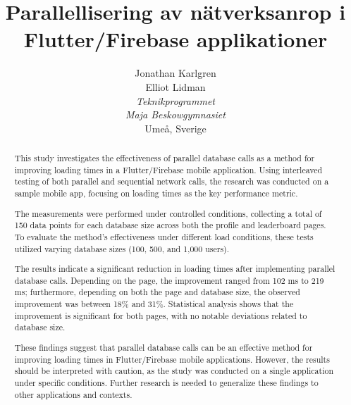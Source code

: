 \documentclass[letterpaper,twocolumn,10pt]{article}
\begin{document}
\RaggedRight

\date{}

\title{Parallellisering av nätverksanrop i Flutter/Firebase applikationer}

\author{{\rm Jonathan Karlgren} \\ {\rm Elliot Lidman} \\
\textit{Teknikprogrammet} \\
\textit{Maja Beskowgymnasiet}\\
{\rm Umeå, Sverige}}

\maketitle

\begin{abstract}
This study investigates the effectiveness of parallel database calls as a method for improving loading times in a Flutter/Firebase mobile application. Using interleaved testing of both parallel and sequential network calls, the research was conducted on a sample mobile app, focusing on loading times as the key performance metric.

The measurements were performed under controlled conditions, collecting a total of 150 data points for each database size across both the profile and leaderboard pages. To evaluate the method's effectiveness under different load conditions, these tests utilized varying database sizes (100, 500, and 1,000 users).

The results indicate a significant reduction in loading times after implementing parallel database calls. Depending on the page, the improvement ranged from 102 ms to 219 ms; furthermore, depending on both the page and database size, the observed improvement was between 18\% and 31\%. Statistical analysis shows that the improvement is significant for both pages, with no notable deviations related to database size.

These findings suggest that parallel database calls can be an effective method for improving loading times in Flutter/Firebase mobile applications. However, the results should be interpreted with caution, as the study was conducted on a single application under specific conditions. Further research is needed to generalize these findings to other applications and contexts.
\end{abstract}

\vspace{1em}
\end{document}
